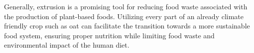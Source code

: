 \vline

Generally, extrusion is a promising tool for reducing food waste associated with the production of plant-based foods. Utilizing every part of an already climate friendly crop such as oat can facilitate the transition towards a more sustainable food system, ensuring proper nutrition while limiting food waste and environmental impact of the human diet. 
